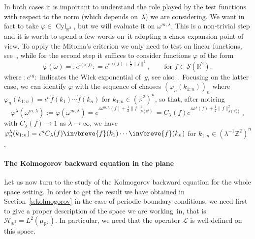 \documentclass[10pt]{article}
\newcommand{\assign}{:=}
\newcommand{\nosymbol}{}
\newcommand{\of}{:}
\newcommand{\tmop}[1]{\ensuremath{\operatorname{#1}}}
\begin{document}
In both cases it is important to understand the role played by the test
functions with respect to the norm (which depends on~$\lambda$) we are
considering. We want in fact to take $\varphi \in \tmop{Cyl}_{\mathbb{R}^2}$,
but we will evaluate it on $\omega^{m, \lambda}$. This is a non-trivial step
and it is worth to spend a few words on~it adopting a chaos expansion point of
view. To apply the Mitoma's criterion we only need to test on linear
functions, see~{\cite{Mitoma1983}}, while for the second step it suffices to
consider functions $\varphi$ of the form
\[ \varphi (\omega) = \of e^{\iota \langle \omega, f \rangle} : = e^{\iota
   \omega (f) + \frac{1}{2} \| f \|^2_{}}, \qquad \text{for } f \in
   \mathcal{S} (\mathbb{R}^2), \]
where $\of \nosymbol e^{\iota g} :$ indicates the Wick exponential of~$g$, see
also~{\cite{gubinelli2019random,gubinelli2015lectures}}. Focusing on the
latter case, we can identify $\varphi$ with the sequence of chaoses
$(\varphi_n (k_{1 : n}))_n$ where $\varphi_n (k_{1 : n}) = \iota^n \hat{f}
(k_1) \cdots \hat{f} (k_n)$ for $k_{1 : n} \in (\mathbb{R}^2)^n$, so that,
after noticing
\[ \varphi^{\lambda} (\omega^{m, \lambda}) \assign \varphi (\omega^{m,
   \lambda}) = e^{\iota \omega^{m, \lambda} (f) + \frac{1}{2} \| f
   \|^2_{\mathcal{S} (\mathbb{R}^2)}} = C_{\lambda} (f) e^{\iota
   \omega^{\lambda} (f) + \frac{1}{2} \| f \|^2_{\mathcal{S}
   (\mathbb{T}^2_{\lambda})}}, \]
with $C_{\lambda} (f) \rightarrow 1$ as $\lambda \rightarrow \infty$, we have
$\varphi^{\lambda}_n (k_{1 : n}) = \iota^n C_{\lambda} (f) \invbreve{f} (k_1)
\cdots \invbreve{f} (k_n)$ for $k_{1 : n} \in (\lambda^{- 1} \mathbb{Z}^2)^n$.

\paragraph{The Kolmogorov backward equation in the plane}Let us now turn to
the study of the Kolmogorov backward equation for the whole space setting. In
order to get the result we have obtained in Section~\ref{s:kolmogorov} in the
case of periodic boundary conditions, we need first to give a proper
description of the space we are working~in, that is
$\mathcal{H}_{\mathbb{R}^2} = L^2 (\mu_{\mathbb{R}^2})$. In particular, we
need that the operator $\mathcal{L}$ is well-defined on this space.
\end{document}
